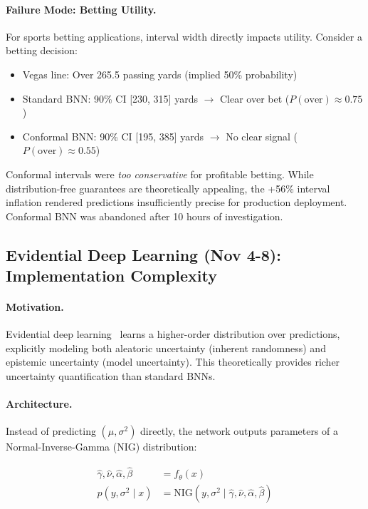 \paragraph{Failure Mode: Betting Utility.}
For sports betting applications, interval width directly impacts utility. Consider a betting decision:
\begin{itemize}[itemsep=2pt,parsep=0pt]
    \item Vegas line: Over 265.5 passing yards (implied 50\% probability)
    \item Standard BNN: 90\% CI [230, 315] yards $\to$ Clear over bet ($P(\text{over}) \approx 0.75$)
    \item Conformal BNN: 90\% CI [195, 385] yards $\to$ No clear signal ($P(\text{over}) \approx 0.55$)
\end{itemize}

Conformal intervals were \textit{too conservative} for profitable betting. While distribution-free guarantees are theoretically appealing, the +56\% interval inflation rendered predictions insufficiently precise for production deployment. Conformal BNN was abandoned after 10 hours of investigation.

\subsection{Evidential Deep Learning (Nov 4-8): Implementation Complexity}

\paragraph{Motivation.}
Evidential deep learning~\cite{sensoy2018evidential} learns a higher-order distribution over predictions, explicitly modeling both aleatoric uncertainty (inherent randomness) and epistemic uncertainty (model uncertainty). This theoretically provides richer uncertainty quantification than standard BNNs.

\paragraph{Architecture.}
Instead of predicting $(\mu, \sigma^2)$ directly, the network outputs parameters of a Normal-Inverse-Gamma (NIG) distribution:

\begin{align}
\hat{\gamma}, \hat{\nu}, \hat{\alpha}, \hat{\beta} &= f_{\theta}(x) \\
p(y, \sigma^2 \mid x) &= \text{NIG}(y, \sigma^2 \mid \hat{\gamma}, \hat{\nu}, \hat{\alpha}, \hat{\beta})
\end{align}

